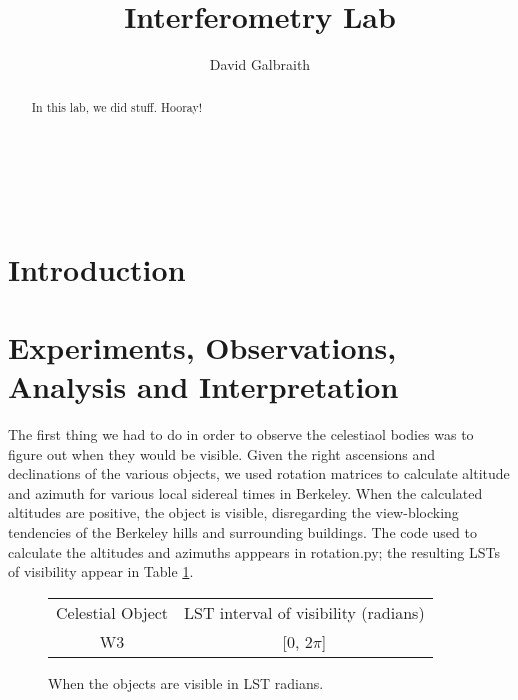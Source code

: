 \documentclass[11pt]{article}
\begin{document}
\title{Interferometry Lab}
\author{David Galbraith}
\maketitle

\normalsize
\begin{abstract} 
In this lab, we did stuff. Hooray! %
\end{abstract}


\medskip                        %

\thispagestyle{plain}

\section{Introduction}


\section{Experiments, Observations, Analysis and Interpretation} 

The first thing we had to do in order to observe the celestiaol bodies was to figure out when they would be visible. Given the right ascensions and declinations of the various objects, we used rotation matrices to calculate altitude and azimuth for various local sidereal times in Berkeley. When the calculated altitudes are positive, the object is visible, disregarding the view-blocking tendencies of the Berkeley hills and surrounding buildings. The code used to calculate the altitudes and azimuths apppears in rotation.py; the resulting LSTs of visibility appear in Table \ref{lsts}.

\begin{figure}
\centering
\begin{tabular}{c|c}
Celestial Object & LST interval of visibility (radians) \\
W3 & [0, 2$\pi$] \\
\end{tabular}
\caption{When the objects are visible in LST radians. \label{lsts}}
\end{figure}
\end{document}
